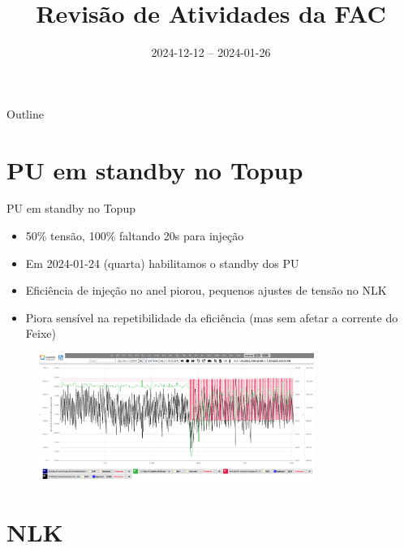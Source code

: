 \documentclass{beamer}					  %
\title{Revisão de Atividades da FAC}	%
\institute{LNLS.DAC.FAC}				%
\date{2024-12-12 -- 2024-01-26}			%
\begin{document}
\begin{frame}
  \titlepage
  \href{https://github.com/lnls-fac/doc-review-dac-fac}{}
  \href{https://www.overleaf.com/read/sbdjxtzfchrm}{}
\end{frame}

\begin{frame}{Outline}
  \tableofcontents
\end{frame}


\section{PU em standby no Topup}

\begin{frame}{PU em standby no Topup}
    \scriptsize{\begin{itemize}
            \item 50\% tensão, 100\% faltando 20s para injeção
    		\item Em 2024-01-24 (quarta) habilitamos o standby dos PU
            \item Eficiência de injeção no anel piorou, pequenos ajustes de tensão no NLK
            \item Piora sensível na repetibilidade da eficiência (mas sem afetar a corrente do Feixe)
    \end{itemize}}
    \begin{figure}[H]
        	\centering
            \includegraphics[width=0.8\textwidth]{2024-01-26/figures/pu-standby.png}
            \label{fig:pu-standby}
    \end{figure} 
\end{frame}


\section{NLK}
\end{document}
